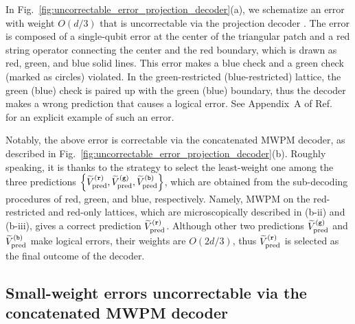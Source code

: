 \documentclass[a4paper,twocolumn,11pt,accepted=2025-01-21]{quantumarticle}
\theoremstyle{definition}
\theoremstyle{definition}
\theoremstyle{definition}
\begin{document}
In Fig.~\ref{fig:uncorrectable_error_projection_decoder}(a), we schematize an error with weight $O(d/3)$ that is uncorrectable via the projection decoder \cite{chamberland2020triangular,beverland2021cost,sahay2022decoder}.
The error is composed of a single-qubit error at the center of the triangular patch and a red string operator connecting the center and the red boundary, which is drawn as red, green, and blue solid lines.
This error makes a blue check and a green check (marked as circles) violated.
In the green-restricted (blue-restricted) lattice, the green (blue) check is paired up with the green (blue) boundary, thus the decoder makes a wrong prediction that causes a logical error.
See Appendix~A of Ref.~\cite{chamberland2020triangular} for an explicit example of such an error.

Notably, the above error is correctable via the concatenated MWPM decoder, as described in Fig.~\ref{fig:uncorrectable_error_projection_decoder}(b).
Roughly speaking, it is thanks to the strategy to select the least-weight one among the three predictions $\qty{\widetilde{V}_{\mathrm{pred}}^{(\texttt{r})}, \widetilde{V}_{\mathrm{pred}}^{(\texttt{g})}, \widetilde{V}_{\mathrm{pred}}^{(\texttt{b})}}$, which are obtained from the sub-decoding procedures of red, green, and blue, respectively.
Namely, MWPM on the red-restricted and red-only lattices, which are microscopically described in (b-ii) and (b-iii), gives a correct prediction $\widetilde{V}_{\mathrm{pred}}^{(\texttt{r})}$.
Although other two predictions $\widetilde{V}_{\mathrm{pred}}^{(\texttt{g})}$ and $\widetilde{V}_{\mathrm{pred}}^{(\texttt{b})}$ make logical errors, their weights are $O(2d/3)$, thus $\widetilde{V}_{\mathrm{pred}}^{(\texttt{r})}$ is selected as the final outcome of the decoder.

\subsection{Small-weight errors uncorrectable via the concatenated MWPM decoder \label{subsec:uncorrectable_errors_concat}}
\end{document}
